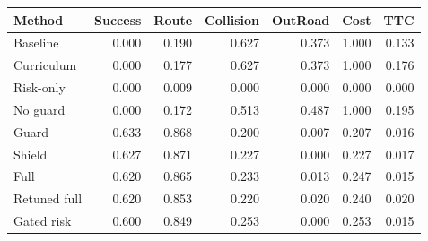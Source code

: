 \begin{tabular}{lrrrrrr}
\toprule
Method & Success & Route & Collision & OutRoad & Cost & TTC \\
\midrule
Baseline & 0.000 & 0.190 & 0.627 & 0.373 & 1.000 & 0.133 \\
Curriculum & 0.000 & 0.177 & 0.627 & 0.373 & 1.000 & 0.176 \\
Risk-only & 0.000 & 0.009 & 0.000 & 0.000 & 0.000 & 0.000 \\
No guard & 0.000 & 0.172 & 0.513 & 0.487 & 1.000 & 0.195 \\
Guard & 0.633 & 0.868 & 0.200 & 0.007 & 0.207 & 0.016 \\
Shield & 0.627 & 0.871 & 0.227 & 0.000 & 0.227 & 0.017 \\
Full & 0.620 & 0.865 & 0.233 & 0.013 & 0.247 & 0.015 \\
Retuned full & 0.620 & 0.853 & 0.220 & 0.020 & 0.240 & 0.020 \\
Gated risk & 0.600 & 0.849 & 0.253 & 0.000 & 0.253 & 0.015 \\
\bottomrule
\end{tabular}
